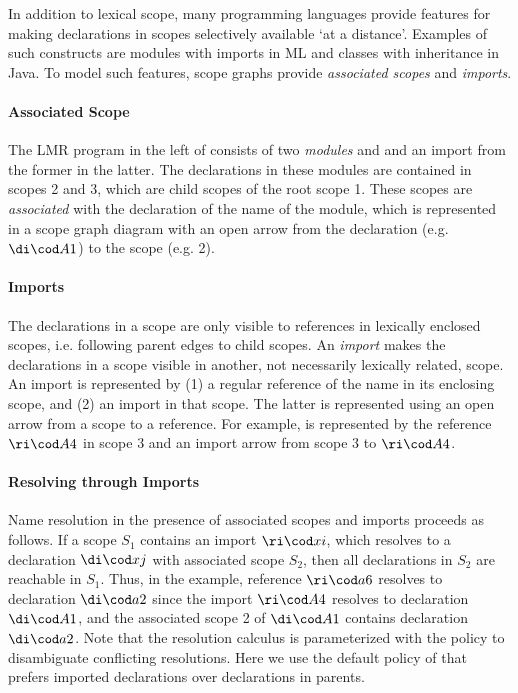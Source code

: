 In addition to lexical scope, many programming languages provide features for
making declarations in scopes selectively available `at a distance'.
Examples of such constructs are modules with imports in ML and classes with
inheritance in Java.
To model such features, scope graphs provide \emph{associated scopes} and
\emph{imports}.

\paragraph{Associated Scope}

The LMR program in the left of  consists of two \emph{modules} 
and  and an import from the former in the latter.
The declarations in these modules are contained in scopes 2 and 3, which are
child scopes of the root scope 1.
These scopes are \emph{associated} with the declaration of the name of the
module, which is represented in a scope graph diagram with an open arrow from
the declaration (e.g. $\dic{A}{1}$) to the scope (e.g. 2).

\paragraph{Imports}

The declarations in a scope are only visible to references in lexically enclosed
scopes, i.e. following parent edges to child scopes.
An \emph{import} makes the declarations in a scope visible in another, not
necessarily lexically related, scope.
An import is represented by (1) a regular reference of the
name in its enclosing scope, and (2) an import in that scope. The latter is
represented using an open arrow from a scope to a reference. For example,
 is represented by the reference $\ric{A}{4}$ in scope 3 and
an import arrow from scope 3 to $\ric{A}{4}$.

\paragraph{Resolving through Imports}

Name resolution in the presence of associated scopes and imports proceeds as
follows. 
If a scope $S_1$ contains an import $\ric{x}{i}$, which resolves to a
declaration $\dic{x}{j}$ with associated scope $S_2$, then all declarations in
$S_2$ are reachable in $S_1$.
Thus, in the example, reference $\ric{a}{6}$ resolves to declaration
$\dic{a}{2}$ since the import $\ric{A}{4}$ resolves to declaration 
$\dic{A}{1}$, and the associated scope 2 of $\dic{A}{1}$ contains declaration
$\dic{a}{2}$.
Note that the resolution calculus is parameterized with the
policy to disambiguate conflicting resolutions. Here we use the default policy
of \cite{NeronTVW-ESOP-2015} that prefers imported declarations over
declarations in parents.

